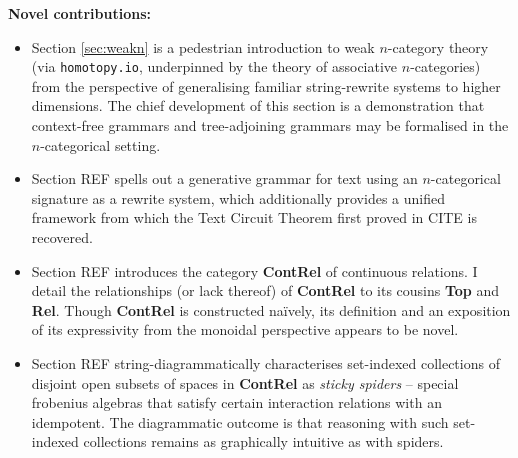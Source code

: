


\thispagestyle{empty}%
\maketitle%


\tableofcontents{}

\clearpage
\newpage
\vfill
\begin{myboxB}
\centering
\textbf{Novel contributions:}
\begin{itemize}

\item Section \ref{sec:weakn} is a pedestrian introduction to weak $n$-category theory (via \texttt{homotopy.io}, underpinned by the theory of associative $n$-categories) from the perspective of generalising familiar string-rewrite systems to higher dimensions. The chief development of this section is a demonstration that context-free grammars and tree-adjoining grammars may be formalised in the $n$-categorical setting.

\item Section \bR REF \e spells out a generative grammar for text using an $n$-categorical signature as a rewrite system, which additionally provides a unified framework from which the Text Circuit Theorem first proved in \bR CITE \e is recovered.

\item Section \bR REF \e introduces the category \textbf{ContRel} of continuous relations. I detail the relationships (or lack thereof) of \textbf{ContRel} to its cousins \textbf{Top} and \textbf{Rel}. Though \textbf{ContRel} is constructed na\"{i}vely, its definition and an exposition of its expressivity from the monoidal perspective appears to be novel.

\item Section \bR REF \e string-diagrammatically characterises set-indexed collections of disjoint open subsets of spaces in \textbf{ContRel} as \emph{sticky spiders} -- special frobenius algebras that satisfy certain interaction relations with an idempotent. The diagrammatic outcome is that reasoning with such set-indexed collections remains as graphically intuitive as with spiders.


\end{itemize}
\end{myboxB}

